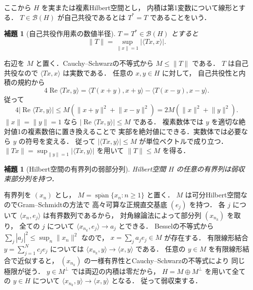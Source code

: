 \documentclass[a5paper,10pt,onecolumn]{jsarticle}
\makeatletter
\theoremstyle{mathnotetheorem}
\newtheorem{lemma}[theorem]{補題}
\renewcommand{\proofname}{証明}
\renewenvironment{proof}[1][\proofname]{%
  \par\pushQED{\qed}\normalfont\topsep4\p@\@plus2\p@\relax
  \trivlist\item[\hskip\labelsep\bfseries #1]\ignorespaces
}{\popQED\endtrivlist\@endpefalse}
\newcommand{\norm}[1]{\lVert #1\rVert}
\makeatother
\begin{document}
ここから $H$ を実または複素Hilbert空間とし，
内積は第1変数について線形とする．
$T\in\mathcal B(H)$ が自己共役であるとは
$T^*=T$ であることをいう．

\begin{lemma}[自己共役作用素の数値半径]\label{lem:numerical}
$T=T^*\in\mathcal B(H)$ とすると
\[
 \norm T=\sup_{\norm x=1}|\langle Tx,x\rangle|.
\]
\end{lemma}
\begin{proof}
右辺を $M$ と置く．Cauchy--Schwarzの不等式から
$M\le\norm T$ である．
$T$ は自己共役なので $\langle Tx,x\rangle$ は実数である．
任意の $x,y\in H$ に対して，
自己共役性と内積の規約から
\[
 4\operatorname{Re}\langle Tx,y\rangle
 =\langle T(x+y),x+y\rangle
  -\langle T(x-y),x-y\rangle.
\]
従って
\[
 4|\operatorname{Re}\langle Tx,y\rangle|
 \le M(\norm{x+y}^2+\norm{x-y}^2)
 =2M(\norm x^2+\norm y^2).
\]
$\norm x=\norm y=1$ なら
$|\operatorname{Re}\langle Tx,y\rangle|\le M$ である．
複素数体では $y$ を適切な絶対値1の複素数倍に置き換えることで
実部を絶対値にできる．実数体では必要なら $y$ の符号を変える．
従って $|\langle Tx,y\rangle|\le M$ が単位ベクトルで成り立つ．
$\norm{Tx}=\sup_{\norm y=1}|\langle Tx,y\rangle|$
を用いて $\norm T\le M$ を得る．
\end{proof}

\begin{lemma}[Hilbert空間の有界列の弱部分列]\label{lem:weak-subseq}
Hilbert空間 $H$ の任意の有界列は弱収束部分列を持つ．
\end{lemma}
\begin{proof}
有界列を $(x_n)$ とし，
$M=\overline{\operatorname{span}}\{x_n:n\ge1\}$ と置く．
$M$ は可分Hilbert空間なのでGram--Schmidtの方法で
高々可算な正規直交基底 $(e_j)$ を持つ．
各 $j$ について
$\langle x_n,e_j\rangle$ は有界数列であるから，
対角線論法によって部分列 $(x_{n_k})$ を取り，
全ての $j$ について
$\langle x_{n_k},e_j\rangle\to a_j$ とできる．
Besselの不等式から
$\sum_j|a_j|^2\le\sup_n\norm{x_n}^2$ なので，
$x=\sum_ja_je_j\in M$ が存在する．
有限線形結合 $y=\sum_{j=1}^Nc_je_j$ については
$\langle x_{n_k},y\rangle\to\langle x,y\rangle$ である．
任意の $y\in M$ を有限線形結合で近似すると，
$(x_{n_k})$ の一様有界性とCauchy--Schwarzの不等式により
同じ極限が従う．
$y\in M^\perp$ では両辺の内積は零だから，
$H=M\oplus M^\perp$ を用いて全ての $y\in H$ について
$\langle x_{n_k},y\rangle\to\langle x,y\rangle$ となる．
従って弱収束する．
\end{proof}
\end{document}
